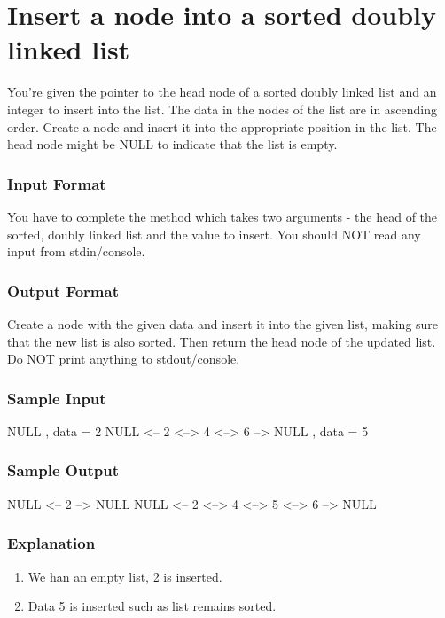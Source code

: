 \section{Insert a node into a sorted doubly linked list} %
\label{sec:Insert-a-node-into-a-sorted-doubly-linked-list}

You’re given the pointer to the head node of a sorted doubly linked list and an integer to insert into the list. The data in the nodes of the list are in ascending order. Create a node and insert it into the appropriate position in the list. The head node might be NULL to indicate that the list is empty.


\subsubsection{Input Format}
You have to complete the  method which takes two arguments - the head of the sorted, doubly linked list and the value to insert. You should NOT read any input from stdin/console.


\subsubsection{Output Format}
Create a node with the given data and insert it into the given list, making sure that the new list is also sorted. Then return the head node of the updated list. Do NOT print anything to stdout/console.


\subsubsection{Sample Input}
\begin{Code}
NULL , data = 2
NULL <– 2 <–> 4 <–> 6 –> NULL , data = 5
\end{Code}


\subsubsection{Sample Output}
\begin{Code}
NULL <-- 2 --> NULL
NULL <-- 2 <--> 4 <--> 5 <--> 6 --> NULL
\end{Code}


\subsubsection{Explanation}
\begin{enumerate}
\item We han an empty list, 2 is inserted.
\item Data 5 is inserted such as list remains sorted.
\end{enumerate}


